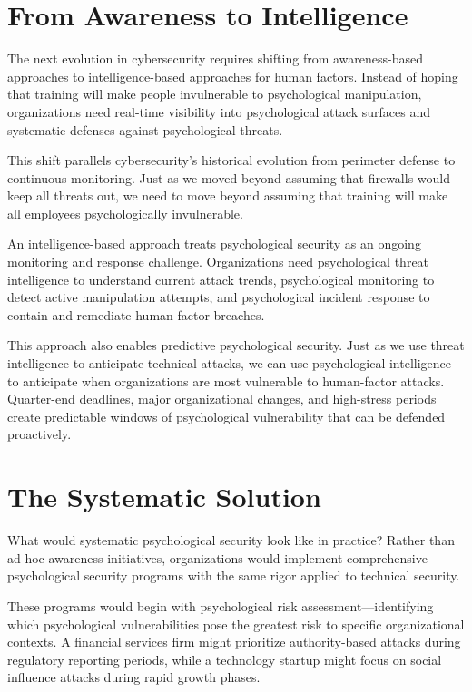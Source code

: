 \documentclass[10pt, twocolumn]{article}
\begin{document}
\section{From Awareness to Intelligence}

The next evolution in cybersecurity requires shifting from awareness-based approaches to intelligence-based approaches for human factors. Instead of hoping that training will make people invulnerable to psychological manipulation, organizations need real-time visibility into psychological attack surfaces and systematic defenses against psychological threats.

This shift parallels cybersecurity's historical evolution from perimeter defense to continuous monitoring. Just as we moved beyond assuming that firewalls would keep all threats out, we need to move beyond assuming that training will make all employees psychologically invulnerable.

An intelligence-based approach treats psychological security as an ongoing monitoring and response challenge. Organizations need psychological threat intelligence to understand current attack trends, psychological monitoring to detect active manipulation attempts, and psychological incident response to contain and remediate human-factor breaches.

This approach also enables predictive psychological security. Just as we use threat intelligence to anticipate technical attacks, we can use psychological intelligence to anticipate when organizations are most vulnerable to human-factor attacks. Quarter-end deadlines, major organizational changes, and high-stress periods create predictable windows of psychological vulnerability that can be defended proactively.

\section{The Systematic Solution}

What would systematic psychological security look like in practice? Rather than ad-hoc awareness initiatives, organizations would implement comprehensive psychological security programs with the same rigor applied to technical security.

These programs would begin with psychological risk assessment—identifying which psychological vulnerabilities pose the greatest risk to specific organizational contexts. A financial services firm might prioritize authority-based attacks during regulatory reporting periods, while a technology startup might focus on social influence attacks during rapid growth phases.
\end{document}
